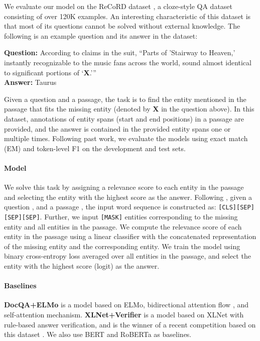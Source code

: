 \documentclass[11pt,a4paper]{article}
\begin{document}
We evaluate our model on the ReCoRD dataset \cite{Zhang2018ReCoRD:Comprehension}, a cloze-style QA dataset consisting of over 120K examples.
An interesting characteristic of this dataset is that most of its questions cannot be solved without external knowledge.
The following is an example question and its answer in the dataset:
\begin{quoting}[vskip=0pt,leftmargin=0.5em,rightmargin=0.5em]
    \textbf{Question:} According to claims in the suit, ``Parts of 'Stairway to Heaven,' instantly recognizable to the music fans across the world, sound almost identical to significant portions of ‘\textbf{X}.’''\\
    \textbf{Answer:} Taurus
\end{quoting}
Given a question and a passage, the task is to find the entity mentioned in the passage that fits the missing entity (denoted by \textbf{X} in the question above).
In this dataset, annotations of entity spans (start and end positions) in a passage are provided, and the answer is contained in the provided entity spans one or multiple times.
Following past work, we evaluate the models using exact match (EM) and token-level F1 on the development and test sets.

\paragraph{Model}

We solve this task by assigning a relevance score to each entity in the passage and selecting the entity with the highest score as the answer.
Following , given a question , and a passage , the input word sequence is constructed as: \texttt{[CLS]}\texttt{[SEP]} \texttt{[SEP]}\texttt{[SEP]}.
Further, we input \texttt{[MASK]} entities corresponding to the missing entity and all entities in the passage.
We compute the relevance score of each entity in the passage using a linear classifier with the concatenated representation of the missing entity and the corresponding entity.
We train the model using binary cross-entropy loss averaged over all entities in the passage, and select the entity with the highest score (logit) as the answer.

\paragraph{Baselines}

\textbf{DocQA+ELMo} \cite{Clark2018SimpleComprehension} is a model based on ELMo, bidirectional attention flow \cite{Seo2017BidirectionalComprehension}, and self-attention mechanism.
\textbf{XLNet+Verifier} \cite{Li2019PinganTasks} is a model based on XLNet with rule-based answer verification, and is the winner of a recent competition based on this dataset \cite{Ostermann2019CommonsenseReport}.
We also use BERT and RoBERTa as baselines.
\end{document}

